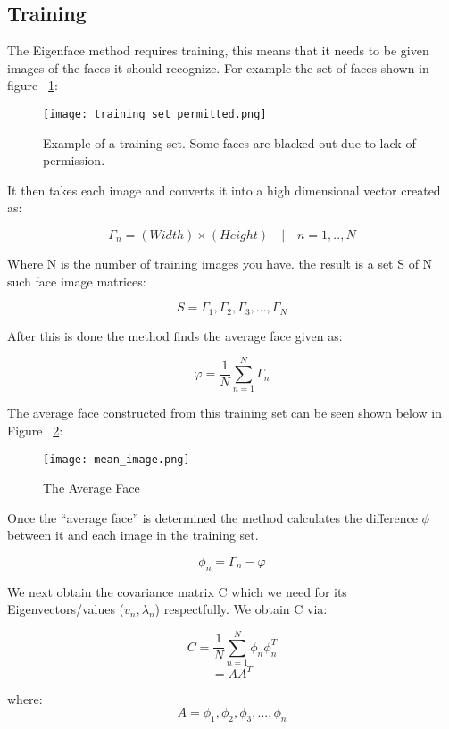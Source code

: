 			\subsection{Training}
			The Eigenface method requires training, this means that it needs to be given images 
			of the faces it should recognize.  For example the set of faces shown in figure ~\ref{fig:Face_set}:
			
			\begin{figure}[h!]
				\centering
				\caption{Example of a training set.  Some faces are blacked out due to lack of permission.\label{fig:Face_set}}
				\texttt{[image: training\_set\_permitted.png]}
			\end{figure}
			
			It then takes each image and converts it into a high dimensional vector created as: 
			
			\[ 		\Gamma_n = (Width)\times(Height) \quad | \quad n = 1,..,N \]
			
			Where N is the number of training images you have.	the result is a set {S} of N such face 
			image matrices: 			
			
			\[		S = {\Gamma_1,\Gamma_2,\Gamma_3,...,\Gamma_N} 		\]	
			
			After this is done the method finds the average face given as:											
			
			\[		\varphi = \frac{1}{N} \sum_{n=1}^{N} \Gamma_n  			\] 
			
			The average face constructed from this training set can be seen shown below in Figure ~\ref{fig:Ave_face}:
			
			\begin{figure}[h!]
				\centering
				\caption{The Average Face\label{fig:Ave_face}}
				\texttt{[image: mean\_image.png]}
			\end{figure}
			
			Once the ``average face'' is determined the method calculates the difference $\phi$ between it and 
			each image in the training set.

			\[ 		\phi_n	=  \Gamma_n - \varphi						\]  
			
		
			We next obtain the covariance matrix C which we need for its Eigenvectors/values ($v_{n}, \lambda_{n}$) 
			respectfully. We obtain C via:
			
			\[		C 	= \frac{1}{N} \sum_{n=1}^{N} \phi_n \phi_n^T 	\] 	
			\[			= AA^T											\]

			where:
			\[ 		A = {\phi_1 , \phi_2, \phi_3, ... , \phi_n} 		\]

